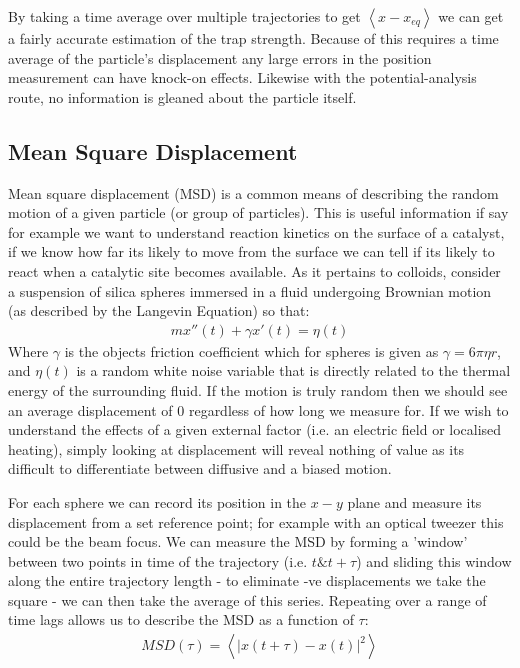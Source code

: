 By taking a time average over multiple trajectories to get $\left<x-x_{eq}\right>$ we can get a fairly accurate estimation of the trap strength. Because of this requires a time average of the particle's displacement any large errors in the position measurement can have knock-on effects. Likewise with the potential-analysis route, no information is gleaned about the particle itself.

\subsection{Mean Square Displacement}
Mean square displacement (MSD) is a common means of describing the random motion of a given particle (or group of particles). This is useful information if say for example we want to understand reaction kinetics on the surface of a catalyst, if we know how far its likely to move from the surface we can tell if its likely to react when a catalytic site becomes available. As it pertains to colloids, consider a suspension of silica spheres immersed in a fluid undergoing Brownian motion (as described by the Langevin Equation) so that:
\begin{align}
	mx''(t) + \gamma x'(t) = \eta(t)
\end{align}
Where $\gamma$ is the objects friction coefficient which for spheres is given as $\gamma = 6\pi\eta r$, and $\eta(t)$ is a random white noise variable that is directly related to the thermal energy of the surrounding fluid. If the motion is truly random then we should see an average displacement of 0 regardless of how long we measure for. If we wish to understand the effects of a given external factor (i.e. an electric field or localised heating), simply looking at displacement will reveal nothing of value as its difficult to differentiate between diffusive and a biased motion. 

For each sphere we can record its position in the $x-y$ plane and measure its displacement from a set reference point; for example with an optical tweezer this could be the beam focus. We can measure the MSD by forming a 'window' between two points in time of the trajectory (i.e. $t \&  t+\tau$) and sliding this window along the entire trajectory length - to eliminate -ve displacements we take the square - we can then take the average of this series. Repeating over a range of time lags allows us to describe the MSD as a function of $\tau$:
\begin{align}
	MSD(\tau) = \left<|x(t+\tau) - x(t)|^2\right>
\end{align}

